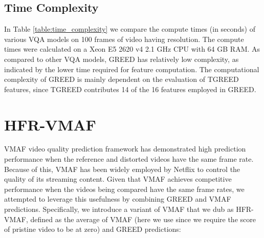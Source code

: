 \documentclass[journal]{IEEEtran}
\begin{document}
\begin{table*}[t]
	\caption{SROCC performance comparison of HFR-VMAF for individual frame rates on the LIVE-YT-HFR Database. In each column the best value is marked in boldface.}
	\label{Table:HFR_VMAF}
	\centering
	\footnotesize
\end{table*}

\subsection{Time Complexity}
In Table \ref{table:time_complexity} we compare the compute times (in seconds) of various VQA models on 100 frames of video having  resolution. The compute times were calculated on a Xeon E5 2620 v4 2.1 GHz CPU with 64 GB RAM. As compared to other VQA models, GREED has relatively low complexity, as indicated by the lower time required for feature computation. The computational complexity of GREED is mainly dependent on the evaluation of TGREED features, since TGREED contributes 14 of the 16 features employed in GREED. 

\section{HFR-VMAF}
VMAF video quality prediction framework has demonstrated high prediction performance when the reference and distorted videos have the same frame rate. Because of this, VMAF has been widely employed by Netflix to control the quality of its streaming content. Given that VMAF achieves competitive performance when the videos being compared have the same frame rates, we attempted to leverage this usefulness by combining GREED and VMAF predictions. Specifically, we introduce a variant of VMAF that we dub as HFR-VMAF, defined as the average of VMAF (here we use  since we require the score of pristine video to be at zero) and GREED predictions:
\end{document}
